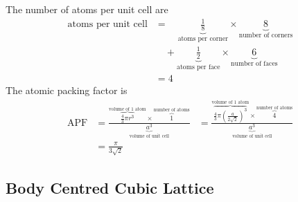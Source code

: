 \documentclass[titlepage, fleqn, a4paper, 12pt, twoside]{article}
\theoremstyle{definition}
\theoremstyle{theorem}
\let\Oldsubsection\subsection
\renewcommand{\subsection}{\FloatBarrier\Oldsubsection}
\begin{document}
The number of atoms per unit cell are
\begin{align*}
	\text{atoms per unit cell} &=\quad \underbrace{\frac{1}{8}}_{\text{atoms per corner}} \times \underbrace{8}_{\text{number of corners}}\\
	&\quad + \underbrace{\frac{1}{2}}_{\text{atoms per face}} \times \underbrace{6}_{\text{number of faces}}\\
	&= 4
\end{align*}
The atomic packing factor is
\begin{align*}
	\text{APF} &= \frac{\overbrace{\frac{4}{3} \pi r^3}^{\text{volume of 1 atom}} \times \overbrace{1}^{\text{number of atoms}}}{\underbrace{a^3}_{\text{volume of unit cell}}}
	&= \frac{\overbrace{\frac{4}{3} \pi \left( \frac{a}{2 \sqrt{2}} \right)^3}^{\text{volume of 1 atom}} \times \overbrace{4}^{\text{number of atoms}}}{\underbrace{a^3}_{\text{volume of unit cell}}}\\
	&= \frac{\pi}{3 \sqrt{2}}
\end{align*}

\subsection{Body Centred Cubic Lattice}
\end{document}

